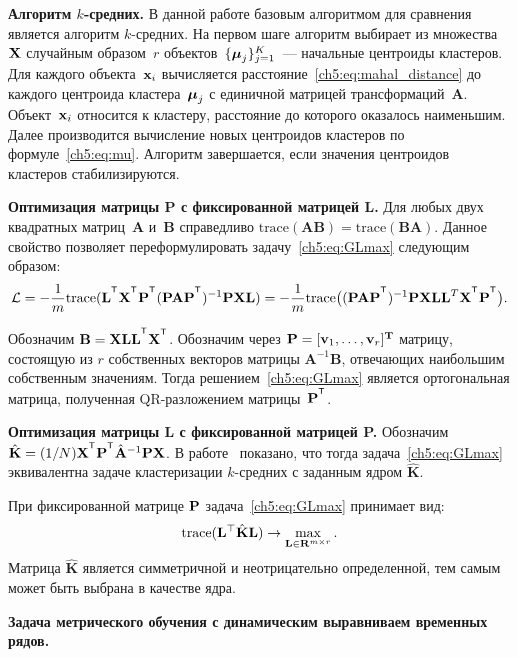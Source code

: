 \documentclass[11pt, a5paper]{dissert}
\begin{document}
\textbf{Алгоритм $k$-средних.}
В данной работе базовым алгоритмом для сравнения является алгоритм $k$-средних.
На первом шаге алгоритм выбирает из множества~$\mathbf{X}$ случайным образом~$r$ объектов~$\{\boldsymbol{\mu}_j\}_{j=1}^K$~--- начальные центроиды кластеров.
Для каждого объекта~$\mathbf{x}_i$ вычисляется расстояние~\eqref{ch5:eq:mahal_distance} до каждого центроида кластера~$\boldsymbol{\mu}_j$ с единичной матрицей трансформаций~$\mathbf{A}$.
Объект~$\mathbf{x}_i$ относится к кластеру, расстояние до которого оказалось наименьшим.
Далее производится вычисление новых центроидов кластеров по формуле~\eqref{ch5:eq:mu}.
Алгоритм завершается, если значения центроидов кластеров стабилизируются.

\textbf{Оптимизация матрицы P с фиксированной матрицей L.}
Для любых двух квадратных матриц~$\mathbf{A}$ и~$\mathbf{B}$ справедливо $\text{trace}(\mathbf{AB}) = \text{trace}(\mathbf{BA})$.
Данное свойство позволяет переформулировать задачу~\eqref{ch5:eq:GLmax} следующим образом:
\[
	\cL = -\frac{1}{m} \text{trace} (\mathbf{L}^{\T} \bX^{\T} \bP^{\T} (\bP \mathbf{A} \bP^{\T})^{-1} \bP \bX \mathbf{L}) = -\frac{1}{m} \text{trace} \bigl((\bP \mathbf{A} \bP^{\T})^{-1} \bP \bX \mathbf{LL}^{T} \bX^{\T} \bP^{\T}\bigr).
\]
\begin{statement}
	Обозначим $\mathbf{B} = \bX \mathbf{LL}^{\T} \bX^{\T}$.
	Обозначим через $\mathbf{P} = [\mathbf{v}_1, \ldots, \mathbf{v}_r]^{\mathbf{T}}$ матрицу, состоящую из $r$ собственных векторов матрицы $\mathbf{A}^{-1}\mathbf{B}$, отвечающих наибольшим собственным значениям.
	Тогда решением~\eqref{ch5:eq:GLmax} является ортогональная матрица, полученная QR-разложением матрицы~$\bP^{\T}$.
\end{statement}

\textbf{Оптимизация матрицы L с фиксированной матрицей P.}
Обозначим $\hat{\mathbf{K}} = (1/N)\bX^{\T} \bP^{\T} \hat{\mathbf{A}}^{-1} \bP \bX$.
В работе~\cite{shawe2004kernel} показано, что тогда задача~\eqref{ch5:eq:GLmax} эквивалентна задаче кластеризации $k$-средних с заданным ядром $\hat{\mathbf{K}}$.

При фиксированной матрице $\mathbf{P}$ задача~\eqref{ch5:eq:GLmax} принимает вид:
\begin{equation*}
	\text{trace} (\mathbf{L}^{\top} \hat{\mathbf{K}} \mathbf{L}) \to \max_{\mathbf{L} \in \mathbf{R}^{m \times r}}.
\end{equation*}
Матрица $\hat{\mathbf{K}}$ является симметричной и неотрицательно определенной, тем самым может быть выбрана в качестве ядра.

\textbf{Задача метрического обучения с динамическим выравниваем временных рядов.}
\label{sec:ch5:metric_learning_classification}
\end{document}
